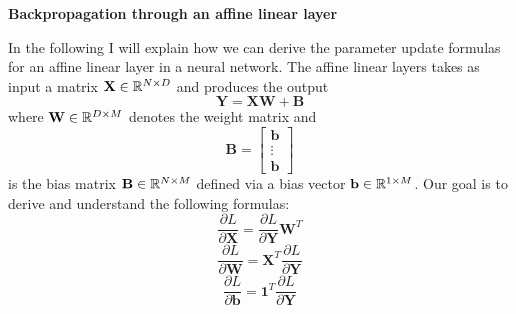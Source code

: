 \documentclass{article}
\begin{document}
\newtheorem*{theorem*}{Theorem}
\newtheorem*{definition*}{Definition}

\noindent \large \textbf{Backpropagation through an affine linear layer} \\
\vspace{0.1cm}
\normalsize

In the following I will explain how we can derive the parameter update formulas
for an affine linear layer in a neural network. The affine linear layers takes
as input a matrix \( \mathbf{X} \in \mathbb{R}^{N \times D}\)  and produces the output
    \[
        \mathbf{Y} = \mathbf{XW} + \mathbf{B}
    \]
where \( \mathbf{W} \in \mathbb{R}^{D \times M} \) denotes the weight matrix and
    \[
        \mathbf{B} = \begin{bmatrix}
            \mathbf{b} \\
            \vdots \\
            \mathbf{b}
        \end{bmatrix}
    \]
is the bias matrix \( \mathbf{B} \in \mathbb{R}^{N \times M} \) defined via a bias 
vector \( \mathbf{b} \in \mathbb{R}^{1 \times M}\). Our goal is to derive and understand 
the following formulas:
    \[
        \frac{\partial L}{\partial \mathbf{X}} = \frac{\partial L}{\partial \mathbf{Y}} \mathbf{W}^T
    \]
    \[
        \frac{\partial L}{\partial \mathbf{W}} = \mathbf{X}^T \frac{\partial L}{\partial \mathbf{Y}}
    \]
    \[
        \frac{\partial L}{\partial \mathbf{b}} = \mathbf{1}^T \frac{\partial L}{\partial \mathbf{Y}}
    \]
\end{document}
